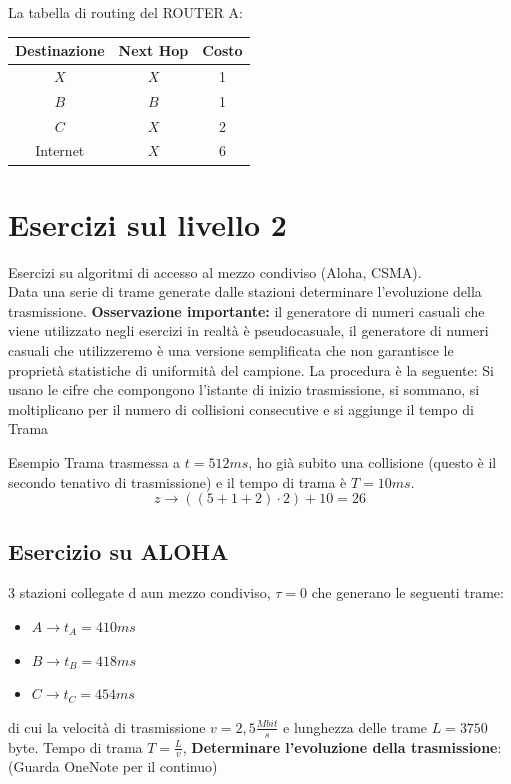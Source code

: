 \documentclass[a4paper]{article}
\begin{document}
La tabella di routing del ROUTER A:

\begin{table}[H]
    \centering
    \begin{tabular}{c|c|c}
        \textbf{Destinazione} & \textbf{Next Hop} & \textbf{Costo} \\ \hline
        $X$ & $X$ & 1 \\
        $B$ & $B$ & 1 \\
        $C$ & $X$ & 2 \\
        Internet & $X$ & 6 \\
    \end{tabular}
\end{table}

\section{Esercizi sul livello 2}

Esercizi su algoritmi di accesso al mezzo condiviso (Aloha, CSMA).
\\
Data una serie di trame generate dalle stazioni determinare l'evoluzione
della trasmissione.
\textbf{Osservazione importante:} il generatore di numeri casuali che viene utilizzato negli esercizi
in realtà è pseudocasuale, il generatore di numeri casuali che utilizzeremo è una versione semplificata
che non garantisce le proprietà statistiche di uniformità del campione.
La procedura è la seguente:
Si usano le cifre che compongono l'istante di inizio trasmissione, si sommano, 
    si moltiplicano per il numero di collisioni consecutive e si aggiunge il tempo di Trama
    \begin{examplebox}{Esempio}
        Trama trasmessa a $t = 512ms$, ho già subito una collisione (questo è il secondo tenativo di trasmissione) e il tempo di trama è $T = 10ms$.
        \[z \rightarrow ((5+1+2)\cdot 2) + 10 = 26\]
    \end{examplebox}

\subsection{Esercizio su ALOHA}

3 stazioni collegate d aun mezzo condiviso, $\tau = 0$ che generano le seguenti trame:
\begin{itemize}
    \item $A \rightarrow t_A = 410ms$
    \item $B \rightarrow t_B = 418ms$
    \item $C \rightarrow t_C = 454ms$
\end{itemize}
di cui la velocità di trasmissione $v = 2,5\frac{Mbit}{s}$ e lunghezza delle trame $L = 3750$ byte.
Tempo di trama $T = \frac{L}{v}$,
\textbf{Determinare l'evoluzione della trasmissione}:
(Guarda OneNote per il continuo)
\end{document}
